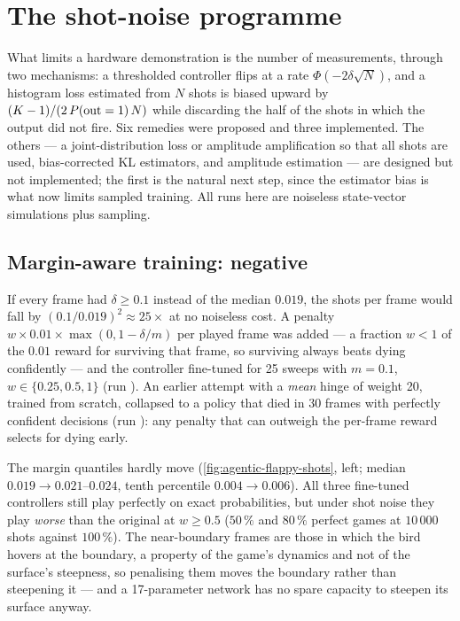 \section{The shot-noise programme}
\label{app:shots}

What limits a hardware demonstration is the number of measurements, through two mechanisms: a
thresholded controller flips at a rate $\Phi(-2\delta\sqrt N)$, and a histogram loss estimated
from $N$ shots is biased upward by $(K-1)/(2\,P(\mathrm{out}=1)\,N)$ while discarding the half of the shots
in which the output did not fire.  Six remedies were proposed and three implemented.  The
others --- a joint-distribution loss or amplitude amplification so that all shots are used,
bias-corrected KL estimators, and amplitude estimation --- are designed but not implemented;
the first is the natural next step, since the estimator bias is what now limits sampled
training.  All runs here are noiseless state-vector simulations plus sampling.

\subsection{Margin-aware training: negative}
\label{app:margin}

If every frame had $\delta\ge0.1$ instead of the median $0.019$, the shots per frame would fall
by $(0.1/0.019)^2\approx25\times$ at no noiseless cost.  A penalty
$w\times0.01\times\max(0,1-\delta/m)$ per played frame was added --- a fraction $w<1$ of the
$0.01$ reward for surviving that frame, so surviving always beats dying confidently --- and the
controller fine-tuned for 25 sweeps with $m=0.1$, $w\in\{0.25,0.5,1\}$ (run
).  An earlier attempt with a \emph{mean} hinge of weight
20, trained from scratch, collapsed to a policy that died in 30 frames with perfectly confident
decisions (run ): any penalty that can outweigh the
per-frame reward selects for dying early.

The margin quantiles hardly move (\cref{fig:agentic-flappy-shots}, left; median
$0.019\to0.021$--$0.024$, tenth percentile $0.004\to0.006$).  All three fine-tuned controllers
still play perfectly on exact probabilities, but under shot noise they play \emph{worse} than
the original at $w\ge0.5$ ($50\,\%$ and $80\,\%$ perfect games at $10\,000$ shots against
$100\,\%$).  The near-boundary frames are those in which the bird hovers at the boundary, a
property of the game's dynamics and not of the surface's steepness, so penalising them moves
the boundary rather than steepening it --- and a 17-parameter network has no spare capacity to
steepen its surface anyway.

